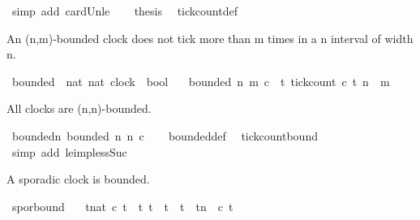 \begin{isabellebody}
\ {\isacharparenleft}simp\ add{\isacharcolon}\ card{\isacharunderscore}Un{\isacharunderscore}le{\isacharparenright}\isanewline
\ \ \isamarkupfalse%
\ {\isacharquery}thesis\ \isamarkupfalse%
\ tick{\isacharunderscore}count{\isacharunderscore}def\ \isacommand{{\isachardot}}\isamarkupfalse%
\isanewline
{}\isamarkupfalse%
%
\endisatagproof
{\isafoldproof}%
%
\isadelimproof
%
\endisadelimproof
%
\isadelimdocument
%
\endisadelimdocument
%
\isatagdocument
%
\isamarkuptrue%
%
\endisatagdocument
{\isafolddocument}%
%
\isadelimdocument
%
\endisadelimdocument
%
\begin{isamarkuptext}%
An (n,m)-bounded clock does not tick more than m times in a n interval of width n.%
\end{isamarkuptext}\isamarkuptrue%
\isamarkupfalse%
\ bounded\ {\isacharcolon}{\isacharcolon}\ {\isacartoucheopen}{\isacharbrackleft}nat{\isacharcomma}\ nat{\isacharcomma}\ clock{\isacharbrackright}\ {\isasymRightarrow}\ bool{\isacartoucheclose}\isanewline
\ \ \ {\isacartoucheopen}bounded\ n\ m\ c\ {\isasymequiv}\ {\isasymforall}t{\isachardot}\ tick{\isacharunderscore}count\ c\ t\ n\ {\isasymle}\ m{\isacartoucheclose}%
\begin{isamarkuptext}%
All clocks are (n,n)-bounded.%
\end{isamarkuptext}\isamarkuptrue%
\isamarkupfalse%
\ bounded{\isacharunderscore}n{\isacharcolon}\ {\isacartoucheopen}bounded\ n\ n\ c{\isacartoucheclose}\isanewline
%
\isadelimproof
\ \ %
\endisadelimproof
%
\isatagproof
{}\isamarkupfalse%
\ bounded{\isacharunderscore}def\ \isamarkupfalse%
\ tick{\isacharunderscore}count{\isacharunderscore}bound\ \isamarkupfalse%
\ {\isacharparenleft}simp\ add{\isacharcolon}\ le{\isacharunderscore}imp{\isacharunderscore}less{\isacharunderscore}Suc{\isacharparenright}%
\endisatagproof
{\isafoldproof}%
%
\isadelimproof
%
\endisadelimproof
%
\begin{isamarkuptext}%
A sporadic clock is bounded.%
\end{isamarkuptext}\isamarkuptrue%
\isamarkupfalse%
\ spor{\isacharunderscore}bound{\isacharcolon}\isanewline
\ \ \ {\isacartoucheopen}{\isasymforall}t{\isacharcolon}{\isacharcolon}nat{\isachardot}\ c\ t\ {\isasymlongrightarrow}\ {\isacharparenleft}{\isasymforall}t{\isacharprime}{\isachardot}\ {\isacharparenleft}t\ {\isacharless}\ t{\isacharprime}\ {\isasymand}\ t{\isacharprime}\ {\isasymle}\ t{\isacharplus}n{\isacharparenright}\ {\isasymlongrightarrow}\ {\isasymnot}{\isacharparenleft}c\ t{\isacharprime}{\isacharparenright}{\isacharparenright}{\isacartoucheclose}\isanewline

\end{isabellebody}
